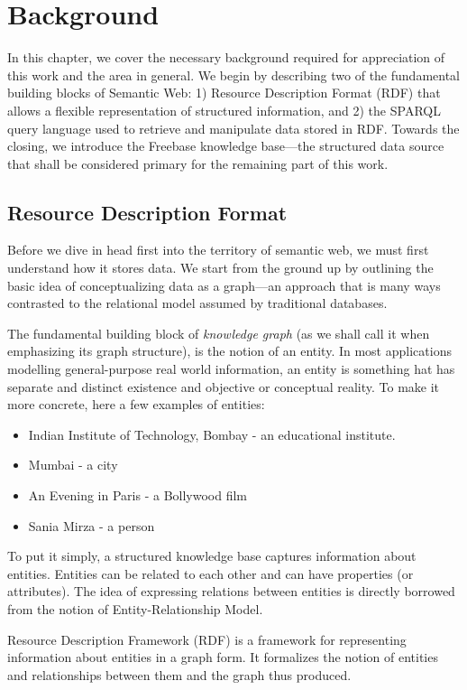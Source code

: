 \chapter{Background}


In this chapter, we cover the necessary background required for appreciation of this work and the area in general. We begin by describing two of the fundamental building blocks of Semantic Web: 1) Resource Description Format (RDF) that allows a flexible representation of structured information, and 2) the SPARQL query language used to retrieve and manipulate data stored in RDF. Towards the closing, we introduce the Freebase knowledge base---the structured data source that shall be considered primary for the remaining part of this work.


\section[RDF]{Resource Description Format}

Before we dive in head first into the territory of semantic web, we must first understand how it stores data. We start from the ground up by outlining the basic idea of conceptualizing data as a graph---an approach that is many ways contrasted to the relational model assumed by traditional databases.

The fundamental building block of \emph{knowledge graph} (as we shall call it when emphasizing its graph structure), is the notion of an entity. In most applications modelling general-purpose real world information, an entity is something hat has separate and distinct existence and objective or conceptual reality. To make it more concrete, here a few examples of entities:
\begin{itemize}
  \item Indian Institute of Technology, Bombay - an educational institute.
  \item Mumbai - a city
  \item An Evening in Paris - a Bollywood film
  \item Sania Mirza - a person
\end{itemize}

To put it simply, a structured knowledge base captures information about entities. Entities can be related to each other and can have properties (or attributes). The idea of expressing relations between entities is directly borrowed from the notion of Entity-Relationship Model.

Resource Description Framework (RDF) is a framework for representing information about entities in a graph form. It formalizes the notion of entities and relationships between them and the graph thus produced. 

